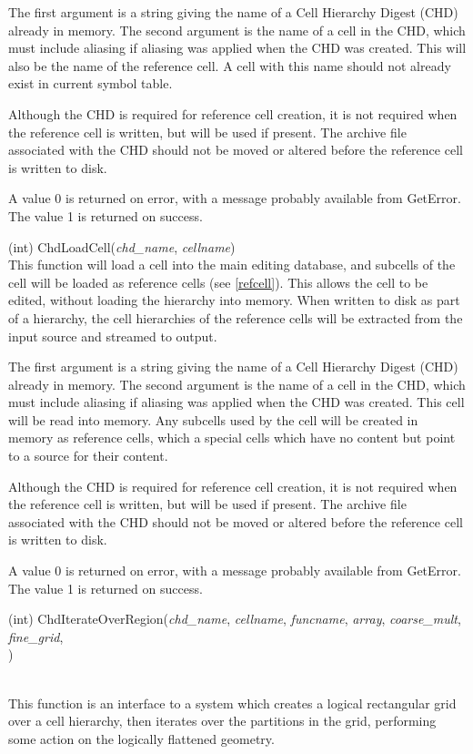 \begin{description}
The first argument is a string giving the name of a Cell Hierarchy
Digest (CHD) already in memory.  The second argument is the name of a
cell in the CHD, which must include aliasing if aliasing was applied
when the CHD was created.  This will also be the name of the reference
cell.  A cell with this name should not already exist in current
symbol table.

Although the CHD is required for reference cell creation, it is not
required when the reference cell is written, but will be used if
present.  The archive file associated with the CHD should not be moved
or altered before the reference cell is written to disk.

A value 0 is returned on error, with a message probably available from
{\vt GetError}.  The value 1 is returned on success.

\item{(int) \vt ChdLoadCell({\it chd\_name\/}, {\it cellname\/})}\\
This function will load a cell into the main editing database, and
subcells of the cell will be loaded as reference cells (see
\ref{refcell}).  This allows the cell to be edited, without loading
the hierarchy into memory.  When written to disk as part of a
hierarchy, the cell hierarchies of the reference cells will be
extracted from the input source and streamed to output.

The first argument is a string giving the name of a Cell Hierarchy
Digest (CHD) already in memory.  The second argument is the name of a
cell in the CHD, which must include aliasing if aliasing was applied
when the CHD was created.  This cell will be read into memory.  Any
subcells used by the cell will be created in memory as reference
cells, which a special cells which have no content but point to a
source for their content.

Although the CHD is required for reference cell creation, it is not
required when the reference cell is written, but will be used if
present.  The archive file associated with the CHD should not be
moved or altered before the reference cell is written to disk.

A value 0 is returned on error, with a message probably available from
{\vt GetError}.  The value 1 is returned on success.

\item{\parbox[t]{6in}{(int) \vt ChdIterateOverRegion({\it chd\_name\/},
 {\it cellname\/}, {\it funcname\/}, {\it array\/}, {\it coarse\_mult\/},
 {\it fine\_grid\/},\\
 \hspace*{1.5cm}{\it bloat\_val})}}\\
This function is an interface to a system which creates a logical
rectangular grid over a cell hierarchy, then iterates over the
partitions in the grid, performing some action on the logically flattened
geometry.


\end{description}
